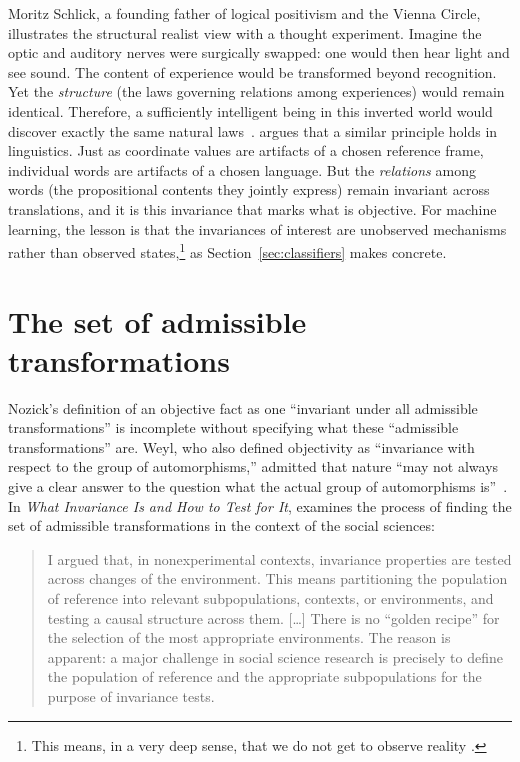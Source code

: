 Moritz Schlick, a founding father of logical positivism and the Vienna Circle, illustrates the structural realist view with a thought experiment. Imagine the optic and auditory nerves were surgically swapped: one would then hear light and see sound. The content of experience would be transformed beyond recognition. Yet the \emph{structure} (the laws governing relations among experiences) would remain identical. Therefore, a sufficiently intelligent being in this inverted world would discover exactly the same natural laws~\citep[pp. 510--511]{schlick1936}. \citet{kosso2003} argues that a similar principle holds in linguistics. Just as coordinate values are artifacts of a chosen reference frame, individual words are artifacts of a chosen language. But the \emph{relations} among words (the propositional contents they jointly express) remain invariant across translations, and it is this invariance that marks what is objective. For machine learning, the lesson is that the invariances of interest are unobserved mechanisms rather than observed states,\footnote{This means, in a very deep sense, that we do not get to observe reality \citep{hoffman2019case}.} as Section~\ref{sec:classifiers} makes concrete.

\section{The set of admissible transformations}\label{sec:admissible}

Nozick's definition of an objective fact as one ``invariant under all admissible transformations'' is incomplete without specifying what these ``admissible transformations'' are. Weyl, who also defined objectivity as ``invariance with respect to the group of automorphisms,'' admitted that nature ``may not always give a clear answer to the question what the actual group of automorphisms is''~\citep[p. 132]{weyl1952}. In \emph{What Invariance Is and How to Test for It}, \citet{russo2014invariance} examines the process of finding the set of admissible transformations in the context of the social sciences:

\begin{quote}
I argued that, in nonexperimental contexts, invariance properties are tested across changes of the environment. This means partitioning the population of reference into relevant subpopulations, contexts, or environments, and testing a causal structure across them. [\ldots] There is no ``golden recipe'' for the selection of the most appropriate environments. The reason is apparent: a major challenge in social science research is precisely to define the population of reference and the appropriate subpopulations for the purpose of invariance tests. \citep[pp. 171--179]{russo2014invariance}
\end{quote}

